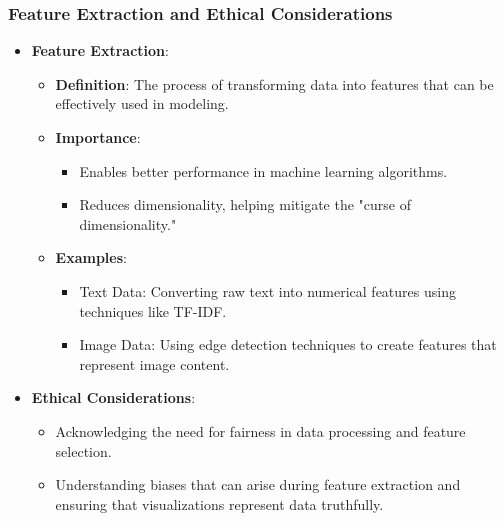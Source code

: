 \documentclass[aspectratio=169]{beamer}
\begin{document}
\begin{frame}[fragile]
    \frametitle{Feature Extraction and Ethical Considerations}
    \begin{itemize}
        \item \textbf{Feature Extraction}:
            \begin{itemize}
                \item \textbf{Definition}: The process of transforming data into features that can be effectively used in modeling.
                \item \textbf{Importance}:
                    \begin{itemize}
                        \item Enables better performance in machine learning algorithms.
                        \item Reduces dimensionality, helping mitigate the "curse of dimensionality."
                    \end{itemize}
                \item \textbf{Examples}:
                    \begin{itemize}
                        \item Text Data: Converting raw text into numerical features using techniques like TF-IDF.
                        \item Image Data: Using edge detection techniques to create features that represent image content.
                    \end{itemize}
            \end{itemize}
    \end{itemize}
    
    \begin{itemize}
        \item \textbf{Ethical Considerations}:
            \begin{itemize}
                \item Acknowledging the need for fairness in data processing and feature selection.
                \item Understanding biases that can arise during feature extraction and ensuring that visualizations represent data truthfully.
            \end{itemize}
    \end{itemize}
\end{frame}
\end{document}
